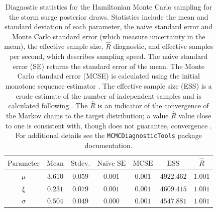 \documentclass[ef,draft]{agutexSI2019}
\begin{document}
\begin{table}[h]
    \centering
    \caption{
        Diagnostic statistics for the Hamiltonian Monte Carlo sampling for the storm surge posterior draws.
        Statistics include the mean and standard deviation of each parameter, the naive standard error and Monte Carlo standard error (which measure uncertainty in the mean), the effective sample size, $\hat{R}$ diagnostic, and effective samples per second, which describes sampling speed.
        The naive standard error (SE) returns the standard error of the mean.
        The Monte Carlo standard error (MCSE) is calculated using the initial monotone sequence estimator \cite[pp.~473-483]{geyer_practical:1992}.
        The effective sample size (ESS) is a crude estimate of the number of independent samples and is calculated following .
        The $\hat{R}$ is an indicator of the convergence of the Markov chains to the target distribution; a value $\hat{R}$ value close to one is consistent with, though does not guarantee, convergence \cite{mcelreath_rethinking2:2020}.
        For additional details see the \texttt{MCMCDiagnosticTools} package documentation.
    }\label{tab:surge-posterior-mcmc-diagnostics}
    \begin{tabular}{ccccccc}
        \toprule
        $\textrm{Parameter}$ & $\textrm{Mean}$ & $\textrm{Stdev.}$ & $\textrm{Naive SE}$ & $\textrm{MCSE}$ & $\textrm{ESS}$ & $\hat{R}$ \\
        \midrule
        $\mu$                & $3.610$         & $0.059$           & $0.001$             & $0.001$         & $4922.462$     & $1.001$   \\
        $\xi$                & $0.231$         & $0.079$           & $0.001$             & $0.001$         & $4609.415$     & $1.001$   \\
        $\sigma$             & $0.504$         & $0.049$           & $0.000$             & $0.001$         & $4547.881$     & $1.001$   \\
        \bottomrule
    \end{tabular}

\end{table}
\end{document}
